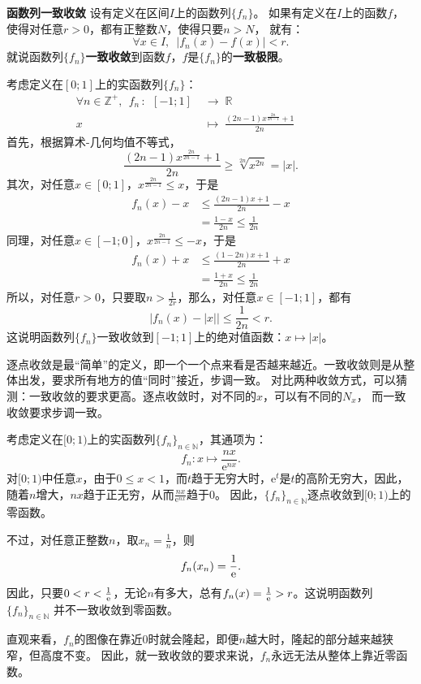 \documentclass[12pt,UTF8,fontset=none]{ctexbook}
\begin{document}
\begin{df}{\textbf{函数列一致收敛}}
    设有定义在区间$I$上的函数列$\{f_n\}$。
    如果有定义在$I$上的函数$f$，使得对任意$r>0$，都有正整数$N$，使得只要$n>N$，
    就有：
    $$ \forall x\in I, \,\,\,|f_n(x) - f(x) | < r.$$
    就说函数列$\{f_n\}$\textbf{一致收敛}到函数$f$，$f$是$\{f_n\}$的\textbf{一致极限}。
\end{df}

\begin{ex}
    考虑定义在$[0;1]$上的实函数列$\{f_n\}$：
    \begin{align*}
        \forall n\in \mathbb{Z}^+, \;\, f_n \,: \,\; [-1;1]\; &\rightarrow \; \mathbb{R} \\
        x \;&\mapsto \; \frac{(2n-1)x^{\frac{2n}{2n-1}} + 1}{2n} \qquad\qquad\phantom{9} 
    \end{align*}
    首先，根据算术-几何均值不等式，
    $$\frac{(2n-1)x^{\frac{2n}{2n-1}} + 1}{2n} \geqslant \sqrt[2n]{x^{2n}} = |x|.$$
    其次，对任意$x\in [0;1]$，$x^{\frac{2n}{2n-1}} \leqslant x$，于是
    \begin{align*}
        f_n(x) - x &\leqslant \frac{(2n-1)x + 1}{2n} - x \\
        &= \frac{1 - x}{2n} \leqslant \frac{1}{2n}
    \end{align*}
    同理，对任意$x\in [-1;0]$，$x^{\frac{2n}{2n-1}} \leqslant -x$，于是
    \begin{align*}
        f_n(x) + x &\leqslant \frac{(1 - 2n)x + 1}{2n} + x \\
        &= \frac{1 + x}{2n} \leqslant \frac{1}{2n}
    \end{align*}
    所以，对任意$r>0$，只要取$n> \frac{1}{2r}$，那么，对任意$x\in [-1;1]$，都有
    $$\Big|f_n(x) - |x|\Big| \leqslant \frac{1}{2n} < r. $$
    这说明函数列$\{f_n\}$一致收敛到$[-1;1]$上的绝对值函数：$x\mapsto |x|$。
\end{ex}

逐点收敛是最“简单”的定义，即一个一个点来看是否越来越近。一致收敛则是从整体出发，要求所有地方的值“同时”接近，步调一致。
对比两种收敛方式，可以猜测：一致收敛的要求更高。逐点收敛时，对不同的$x$，可以有不同的$N_x$，
而一致收敛要求步调一致。

\begin{ex}
    考虑定义在$[0;1)$上的实函数列$\{f_n\}_{n\in\mathbb{N}}$，其通项为：
    $$ f_n: x \mapsto \frac{nx}{\mathrm{e}^{nx}}. $$
    对$[0;1)$中任意$x$，由于$0\leqslant x<1$，而$t$趋于无穷大时，$\mathrm{e}^t$是$t$的高阶无穷大，因此，随着$n$增大，$nx$趋于正无穷，从而$\frac{nx}{\mathrm{e}^{nx}}$趋于$0$。
    因此，$\{f_n\}_{n\in\mathbb{N}}$逐点收敛到$[0;1)$上的零函数。

    不过，对任意正整数$n$，取$x_n = \frac{1}{n}$，则
    $$f_n(x_n) = \frac{1}{\mathrm{e}}.$$
    因此，只要$0<r <\frac{1}{\mathrm{e}}$，无论$n$有多大，总有$f_n(x) = \frac{1}{\mathrm{e}} > r$。这说明函数列$\{f_n\}_{n\in\mathbb{N}}$
    并不一致收敛到零函数。
    
    直观来看，$f_n$的图像在靠近$0$时就会隆起，即便$n$越大时，隆起的部分越来越狭窄，但高度不变。
    因此，就一致收敛的要求来说，$f_n$永远无法从整体上靠近零函数。

\end{ex}
\end{document}
